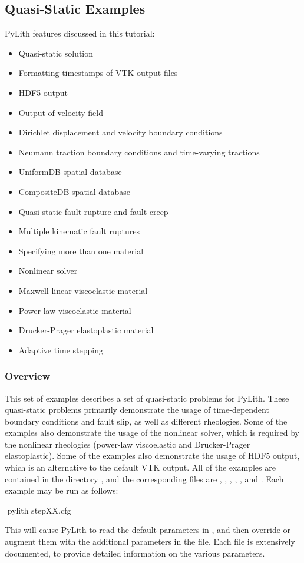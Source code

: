 \subsection{Quasi-Static Examples}
\label{sec:example:3dhex8-quasistatic}

PyLith features discussed in this tutorial:
\begin{itemize}
\item Quasi-static solution
\item Formatting timestamps of VTK output files
\item HDF5 output
\item Output of velocity field
\item Dirichlet displacement and velocity boundary conditions
\item Neumann traction boundary conditions and time-varying tractions
\item UniformDB spatial database
\item CompositeDB spatial database
\item Quasi-static fault rupture and fault creep
\item Multiple kinematic fault ruptures
\item Specifying more than one material
\item Nonlinear solver
\item Maxwell linear viscoelastic material
\item Power-law viscoelastic material
\item Drucker-Prager elastoplastic material
\item Adaptive time stepping
\end{itemize}

\subsubsection{Overview}

This set of examples describes a set of quasi-static problems for
PyLith. These quasi-static problems primarily demonstrate the usage
of time-dependent boundary conditions and fault slip, as well as different
rheologies. Some of the examples also demonstrate the usage of the
nonlinear solver, which is required by the nonlinear rheologies (power-law
viscoelastic and Drucker-Prager elastoplastic). Some of the examples
also demonstrate the usage of HDF5 output, which is an alternative
to the default VTK output. All of the examples are contained in the
directory , and the corresponding 
files are , , ,
, , and .
Each example may be run as follows:
\begin{shell}
$$ pylith stepXX.cfg
\end{shell}
This will cause PyLith to read the default parameters in ,
and then override or augment them with the additional parameters in
the  file. Each  file is extensively
documented, to provide detailed information on the various parameters.



